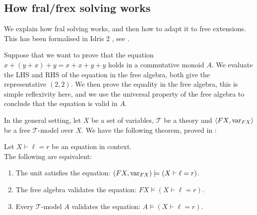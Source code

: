 


\subsection{How fral/frex solving works}
\label{sec:solving}

We explain how fral solving works, and then how to adapt it to free extensions. This has been formalised in Idris 2 \parencite{idris_frex}, see .

Suppose that we want to prove that the equation $x + (y + x) + y = x + x + y + y$ holds in a commutative monoid $A$. We evaluate the LHS and RHS of the equation in the free algebra, both give the representative $(2, 2)$. We then prove the equality in the free algebra, this is simple reflexivity here, and we use the universal property of the free algebra to conclude that the equation is valid in $A$.


In the general setting, let $X$ be a set of variables, $\mathcal{T}$ be a theory and $\left\langle FX, \operatorname{var}_{FX} \right\rangle$ be a free $\mathcal{T}$-model over $X$. We have the following theorem, proved in :

\begin{theorem}
  \label{thm:fral_solving}
  Let $X \vdash \ell = r$ be an equation in context.\\ The following are equivalent:
  \begin{enumerate}
    \item The unit satisfies the equation: $(FX, \operatorname{var}_{FX}) \models (X \vdash \ell = r)$.
    \item The free algebra validates the equation: $FX \models (X \vdash \ell = r)$.
    \item Every $\mathcal{T}$-model $A$ validates the equation: $A \models (X \vdash \ell = r)$.
  \end{enumerate}
\end{theorem}

